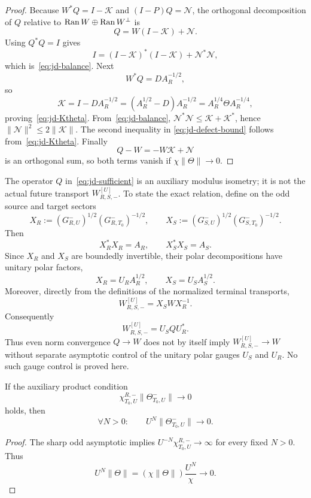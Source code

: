 \begin{proof}
Because $W^*Q=I-\mathscr K$ and $(I-P)Q=\mathscr N$, the orthogonal decomposition of
$Q$ relative to $\operatorname{Ran} W\oplus\operatorname{Ran} W^\perp$ is
\[
 Q=W(I-\mathscr K)+\mathscr N.
\]
Using $Q^*Q=I$ gives
\[
 I=(I-\mathscr K)^*(I-\mathscr K)+\mathscr N^*\mathscr N,
\]
which is~\eqref{eq:jd-balance}.  Next
\[
 W^*Q=DA_R^{-1/2},
\]
so
\[
 \mathscr K
 =I-DA_R^{-1/2}
 =(A_R^{1/2}-D)A_R^{-1/2}
 =A_R^{1/4}\Theta A_R^{-1/4},
\]
proving~\eqref{eq:jd-Ktheta}.  From~\eqref{eq:jd-balance},
$\mathscr N^*\mathscr N\le\mathscr K+\mathscr K^*$, hence
$\|\mathscr N\|^2\le2\|\mathscr K\|$.  The second inequality in
\eqref{eq:jd-defect-bound} follows from~\eqref{eq:jd-Ktheta}.  Finally
\[
 Q-W=-W\mathscr K+\mathscr N
\]
is an orthogonal sum, so both terms vanish if $\chi\|\Theta\|\to0$.
\end{proof}

\begin{remark}\label{rem:polar-gauge}
The operator $Q$ in~\eqref{eq:jd-sufficient} is an auxiliary modulus isometry; it is
not the actual future transport $W_{R,S,-}^{[U]}$.  To state the exact relation, define
on the odd source and target sectors
\[
 X_R:=(G_{R,U}^-)^{1/2}(G_{R,T_0}^-)^{-1/2},
 \qquad
 X_S:=(G_{S,U}^-)^{1/2}(G_{S,T_0}^-)^{-1/2}.
\]
Then
\[
 X_R^*X_R=A_R,
 \qquad
 X_S^*X_S=A_S.
\]
Since $X_R$ and $X_S$ are boundedly invertible, their polar decompositions have
unitary polar factors,
\[
 X_R=U_RA_R^{1/2},
 \qquad
 X_S=U_SA_S^{1/2}.
\]
Moreover, directly from the definitions of the normalized terminal transports,
\[
 W_{R,S,-}^{[U]}=X_SWX_R^{-1}.
\]
Consequently
\[
 \boxed{
 W_{R,S,-}^{[U]}=U_SQU_R^*.
 }
\tag{JD.10a}\label{eq:jd-polar-gauge}
\]
Thus even norm convergence $Q\to W$ does not by itself imply
$W_{R,S,-}^{[U]}\to W$ without separate asymptotic control of the unitary polar gauges
$U_S$ and $U_R$.  No such gauge control is proved here.
\end{remark}

\begin{corollary}\label{cor:beyond}
If the auxiliary product condition
\[
 \chi_{T_0,U}^{R,-}\|\Theta_{T_0,U}^-\|\to0
\]
holds, then
\[
 \boxed{\forall N>0:\qquad U^N\|\Theta_{T_0,U}^-\|\to0.}
\tag{JD.11}\label{eq:jd-beyond}
\]
\end{corollary}

\begin{proof}
The sharp odd asymptotic implies
$U^{-N}\chi_{T_0,U}^{R,-}\to\infty$ for every fixed $N>0$.  Thus
\[
 U^N\|\Theta\|
 =(\chi\|\Theta\|)\frac{U^N}{\chi}\longrightarrow0.
\]
\end{proof}

